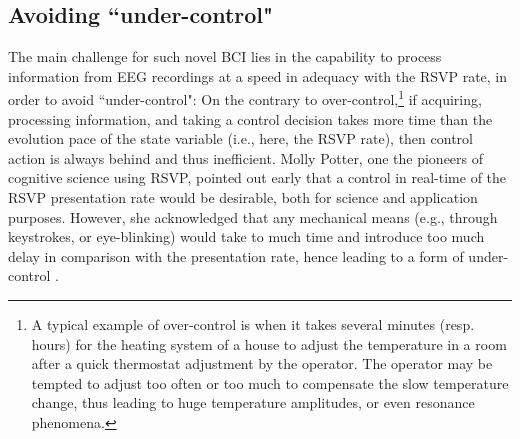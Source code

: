 \subsection{Avoiding ``under-control"}
The main challenge for such novel BCI lies in the capability to process information from EEG recordings at a speed in adequacy with the RSVP rate, in order to avoid ``under-control": On the contrary to over-control,\footnote{A typical example of over-control is when it takes several minutes (resp. hours) for the heating system of a house to adjust the temperature in a room after a quick thermostat adjustment by the operator. The operator may be tempted to adjust too often or too much to compensate the slow temperature change, thus leading to huge temperature amplitudes, or even resonance phenomena.} if acquiring, processing information, and taking a control decision takes more time than the evolution pace of the state variable (i.e., here, the RSVP rate), then control action is always behind and thus inefficient. Molly Potter, one the pioneers of cognitive science using RSVP, pointed out early that a control in real-time of the RSVP presentation rate would be desirable, both for science and application purposes. However, she acknowledged that any mechanical means (e.g., through keystrokes, or eye-blinking) would take to much time and introduce too much delay in comparison with the presentation rate, hence leading to a form of under-control \cite{potter1984rapid}.

